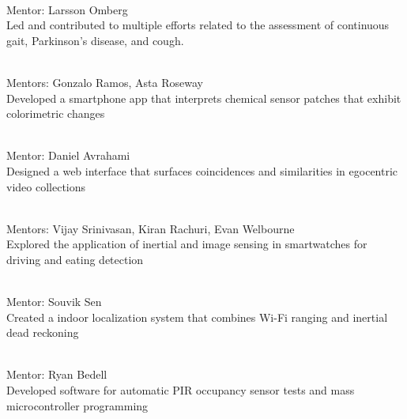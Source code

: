  \\
Mentor: Larsson Omberg \\
Led and contributed to multiple efforts related to the assessment of continuous gait, Parkinson's disease, and cough.
\vspace{5pt}

 \\
Mentors: Gonzalo Ramos, Asta Roseway \\
Developed a smartphone app that interprets chemical sensor patches that exhibit colorimetric changes
\vspace{5pt}

 \\
Mentor: Daniel Avrahami \\
Designed a web interface that surfaces coincidences and similarities in egocentric video collections
\vspace{5pt}

 \\
Mentors: Vijay Srinivasan, Kiran Rachuri, Evan Welbourne \\
Explored the application of inertial and image sensing in smartwatches for driving and eating detection
\vspace{5pt}

 \\
Mentor: Souvik Sen \\
Created a indoor localization system that combines Wi-Fi ranging and inertial dead reckoning
\vspace{5pt}

 \\
Mentor: Ryan Bedell \\
Developed software for automatic PIR occupancy sensor tests and mass microcontroller programming